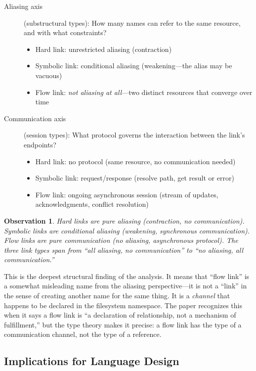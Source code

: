 \documentclass[11pt]{article}
\newtheorem{observation}{Observation}
\begin{document}
\begin{description}
  \item[Aliasing axis] (substructural types): How many names can refer to the
    same resource, and with what constraints?
    \begin{itemize}
      \item Hard link: unrestricted aliasing (contraction)
      \item Symbolic link: conditional aliasing (weakening---the alias may be
        vacuous)
      \item Flow link: \emph{not aliasing at all}---two distinct resources that
        converge over time
    \end{itemize}
  \item[Communication axis] (session types): What protocol governs the
    interaction between the link's endpoints?
    \begin{itemize}
      \item Hard link: no protocol (same resource, no communication needed)
      \item Symbolic link: request/response (resolve path, get result or error)
      \item Flow link: ongoing asynchronous session (stream of updates,
        acknowledgments, conflict resolution)
    \end{itemize}
\end{description}

\begin{observation}
Hard links are pure aliasing (contraction, no communication). Symbolic links
are conditional aliasing (weakening, synchronous communication). Flow links
are pure communication (no aliasing, asynchronous protocol). The three link
types span from ``all aliasing, no communication'' to ``no aliasing, all
communication.''
\end{observation}

This is the deepest structural finding of the analysis. It means that
``flow link'' is a somewhat misleading name from the aliasing perspective---it
is not a ``link'' in the sense of creating another name for the same thing. It
is a \emph{channel} that happens to be declared in the filesystem namespace.
The paper recognizes this when it says a flow link is ``a declaration of
relationship, not a mechanism of fulfillment,'' but the type theory makes it
precise: a flow link has the type of a communication channel, not the type of
a reference.

\subsection{Implications for Language Design}
\end{document}
